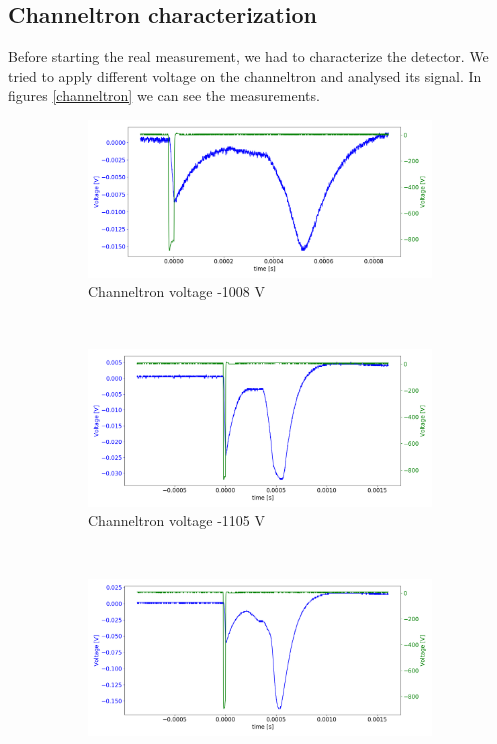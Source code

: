 \documentclass[a4paper,10pt]{article}
\begin{document}
\subsection{Channeltron characterization}
Before starting the real measurement, we had to characterize the detector. We tried to apply different voltage on the channeltron and analysed its signal. In figures \ref{channeltron}
we can see the measurements. 
\begin{figure}[H]
  \centering{}
  \begin{subfigure}[t]{0.45 \textwidth}
    \centering
    \includegraphics[width= \textwidth]{channeltron1}
    \caption{Channeltron voltage -1008 V}\label{channeltron1}
  \end{subfigure}
  ~
  \begin{subfigure}[t]{0.45 \textwidth}
    \centering
    \includegraphics[width=\textwidth]{channeltron2}
    \caption{Channeltron voltage -1105 V}\label{channeltron2}
  \end{subfigure}
  ~
  \begin{subfigure}[t]{0.45 \textwidth}
    \centering
    \includegraphics[width=\textwidth]{channeltron3}

\end{subfigure}
\end{figure}
\end{document}
